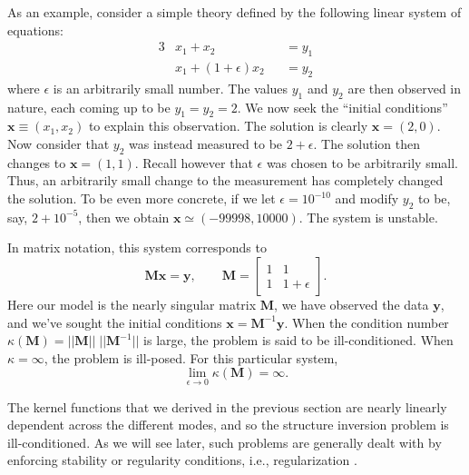 As an example, consider a simple theory defined by the following linear system of equations:
\begin{alignat}{3}
    &x_1 + x_2& &= y_1 \\
    &x_1 + (1+\epsilon)x_2& &= y_2
\end{alignat}
where $\epsilon$ is an arbitrarily small number. %
The values $y_1$ and $y_2$ are then observed in nature, each coming up to be ${y_1=y_2=2}$. 
We now seek the ``initial conditions'' ${\mathbf{x} \equiv (x_1,x_2)}$ to explain this observation. 
The solution is clearly ${\mathbf{x}=(2,0)}$. 
Now consider that $y_2$ was instead measured to be ${2+\epsilon}$. 
The solution then changes to ${\mathbf{x}=(1,1)}$. 
Recall however that $\epsilon$ was chosen to be arbitrarily small. 
Thus, an arbitrarily small change to the measurement has completely changed the solution. 
To be even more concrete, if we let ${\epsilon=10^{-10}}$ and modify $y_2$ to be, say, ${2+10^{-5}}$, then we obtain ${\mathbf{x}\simeq(-99998, 10000)}$. 
The system is unstable. 

In matrix notation, this system corresponds to
\begin{equation}
    \mathbf{M}\mathbf{x}
    =
    \mathbf{y},
    \qquad
    \mathbf{M}
    =
    \begin{bmatrix}
        1 & 1 \\
        1 & 1+\epsilon 
    \end{bmatrix}. \iffalse,
    \qquad
    \mathbf{y}
    =
    \begin{bmatrix}
        2\\2
    \end{bmatrix}.
    \fi
\end{equation}
Here our model is the nearly singular matrix $\mathbf{M}$, we have observed the data $\mathbf{y}$, and we've sought the initial conditions ${\mathbf{x}=\mathbf{M}^{-1}\mathbf{y}}$. 
When the condition number ${\kappa(\mathbf{M})=||\mathbf{M}||\;||\mathbf{M}^{-1}||}$ is large, the problem is said to be ill-conditioned. 
When ${\kappa = \infty}$, the problem is ill-posed. 
For this particular system, 
\begin{equation}
    \lim_{\epsilon\to 0} \kappa(\mathbf{M}) = \infty.
\end{equation}

The kernel functions that we derived in the previous section are nearly linearly dependent across the different modes, and so the structure inversion problem is ill-conditioned. 
As we will see later, such problems are generally dealt with by enforcing stability or regularity conditions, i.e., regularization \citep[e.g.,][]{tikhonov1977solutions, tenorio2001statistical}. 


